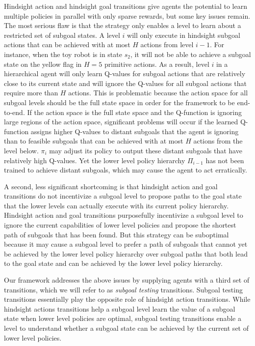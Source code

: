 \documentclass{article} %
\begin{document}
Hindsight action and hindsight goal transitions give agents the potential to learn multiple policies in parallel with only sparse rewards, but some key issues remain.  The most serious flaw is that the strategy only enables a level to learn about a restricted set of subgoal states.  A level $i$ will only execute in hindsight subgoal actions that can be achieved with at most $H$ actions from level $i-1$.  For instance, when the toy robot is in state $s_2$, it will not be able to achieve a subgoal state on the yellow flag in $H=5$ primitive actions.  As a result, level $i$ in a hierarchical agent will only learn Q-values for subgoal actions that are relatively close to its current state and will ignore the Q-values for all subgoal actions that require more than $H$ actions.  This is problematic because the action space for all subgoal levels should be the full state space in order for the framework to be end-to-end.  If the action space is the full state space and the Q-function is ignoring large regions of the action space, significant problems will occur if the learned Q-function assigns higher Q-values to distant subgoals that the agent is ignoring than to feasible subgoals that can be achieved with at most $H$ actions from the level below.  $\pi_i$ may adjust its policy to output these distant subgoals that have relatively high Q-values.  Yet the lower level policy hierarchy $\Pi_{i-1}$ has not been trained to achieve distant subgoals, which may cause the agent to act erratically.

A second, less significant shortcoming is that hindsight action and goal transitions do not incentivize a subgoal level to propose paths to the goal state that the lower levels can actually execute with its current policy hierarchy.  Hindsight action and goal transitions purposefully incentivize a subgoal level to ignore the current capabilities of lower level policies and propose the shortest path of subgoals that has been found.  But this strategy can be suboptimal because it may cause a subgoal level to prefer a path of subgoals that cannot yet be achieved by the lower level policy hierarchy over subgoal paths that both lead to the goal state and can be achieved by the lower level policy hierarchy.  

Our framework addresses the above issues by supplying agents with a third set of transitions, which we will refer to as \textit{subgoal testing} transitions.  Subgoal testing transitions essentially play the opposite role of hindsight action transitions.  While hindsight actions transitions help a subgoal level learn the value of a subgoal state when lower level policies are optimal, subgoal testing transitions enable a level to understand whether a subgoal state can be achieved by the current set of lower level policies.  
\end{document}
